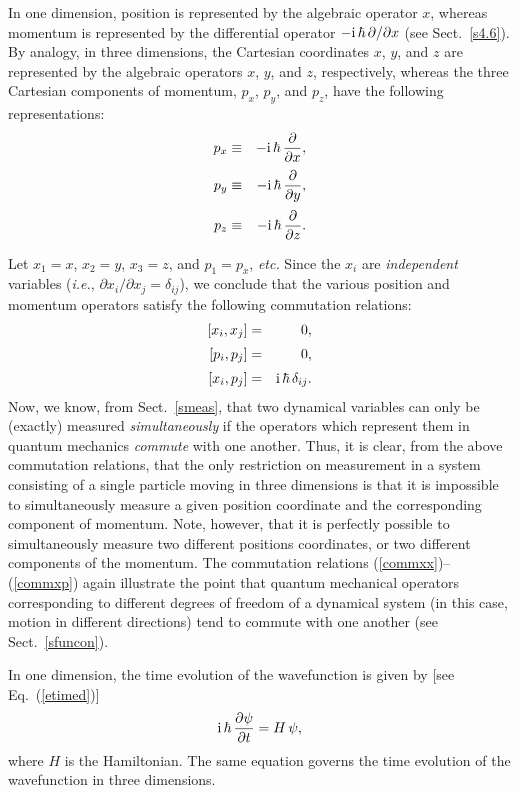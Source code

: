 In one dimension, position is represented by the algebraic operator $x$,
whereas momentum is represented by the differential operator
$-{\rm i}\,\hbar\,\partial/\partial x$ (see Sect.~\ref{s4.6}). By analogy, in
three dimensions, the Cartesian coordinates $x$, $y$, and $z$
are represented by the algebraic operators $x$, $y$, and $z$,
respectively, whereas the three Cartesian components of momentum,
$p_x$, $p_y$, and $p_z$, have the following representations:
\begin{eqnarray}\label{e6.12}
p_x &\equiv & -{\rm i}\,\hbar\,\frac{\partial}{\partial x},\\[0.5ex]
p_y &\equiv & -{\rm i}\,\hbar\,\frac{\partial}{\partial y},\\[0.5ex]
p_z &\equiv & -{\rm i}\,\hbar\,\frac{\partial}{\partial z}.\label{e6.14}
\end{eqnarray}

Let $x_1 =x$, $x_2=y$,  $x_3=z$, and $p_1=p_x$, {\em etc.}
Since the $x_i$ are {\em independent}\/ variables ({\em i.e.},
$\partial x_i/\partial x_j=\delta_{ij}$), we conclude that the
various position and momentum operators satisfy the following commutation
relations:
\begin{eqnarray}\label{commxx}
[x_i,x_j] &=& 0,\\[0.5ex]
[p_i,p_j] &=& 0,\label{commpp}\\[0.5ex]
[x_i,p_j] &=& {\rm i}\,\hbar\,\delta_{ij}.\label{commxp}
\end{eqnarray}
Now, we know, from Sect.~\ref{smeas}, that two dynamical variables
can only be (exactly) measured {\em simultaneously}\/ if the operators which represent
them in quantum mechanics {\em commute}\/ with one another. Thus,
it is clear, from the above commutation relations, that the only restriction
on measurement in a system consisting of a single particle moving in
three dimensions is that it is impossible to
simultaneously measure a given position coordinate and the corresponding
component of momentum. Note, however, that it is perfectly possible to
simultaneously measure two different positions coordinates, or two
different components of the momentum. The commutation
relations (\ref{commxx})--(\ref{commxp}) again illustrate the
point that  quantum mechanical operators corresponding to different degrees of freedom of a
dynamical system (in this case, motion in different directions) tend to commute
with one another (see Sect.~\ref{sfuncon}).

In one dimension, the time evolution of the wavefunction is given
by [see Eq.~(\ref{etimed})]
\begin{equation}\label{e6.15}
{\rm i}\,\hbar\,\frac{\partial\psi}{\partial t} = H\,\psi,
\end{equation}
where 
$H$  is the  Hamiltonian. The same equation
governs the time evolution of the wavefunction in three dimensions.

